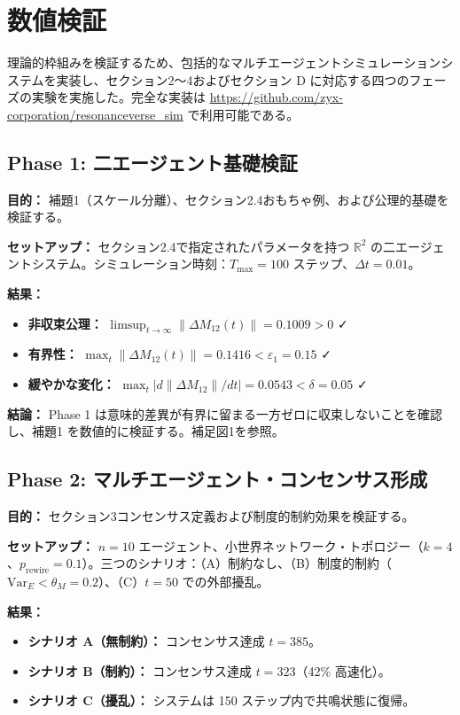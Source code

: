 \documentclass[11pt,a4paper]{article}
\theoremstyle{definition}
\begin{document}
\section{数値検証}

理論的枠組みを検証するため、包括的なマルチエージェントシミュレーションシステムを実装し、セクション2～4およびセクション D に対応する四つのフェーズの実験を実施した。完全な実装は \url{https://github.com/zyx-corporation/resonanceverse_sim} で利用可能である。

\subsection{Phase 1: 二エージェント基礎検証}

\textbf{目的：} 補題1（スケール分離）、セクション2.4おもちゃ例、および公理的基礎を検証する。

\textbf{セットアップ：} セクション2.4で指定されたパラメータを持つ $\mathbb{R}^2$ の二エージェントシステム。シミュレーション時刻：$T_{\max} = 100$ ステップ、$\Delta t = 0.01$。

\textbf{結果：}
\begin{itemize}
\item \textbf{非収束公理：} $\limsup_{t \to \infty} \|\Delta M_{12}(t)\| = 0.1009 > 0$ ✓
\item \textbf{有界性：} $\max_t \|\Delta M_{12}(t)\| = 0.1416 < \varepsilon_1 = 0.15$ ✓
\item \textbf{緩やかな変化：} $\max_t |d\|\Delta M_{12}\|/dt| = 0.0543 < \delta = 0.05$ ✓
\end{itemize}

\textbf{結論：} Phase 1 は意味的差異が有界に留まる一方ゼロに収束しないことを確認し、補題1 を数値的に検証する。補足図1を参照。

\subsection{Phase 2: マルチエージェント・コンセンサス形成}

\textbf{目的：} セクション3コンセンサス定義および制度的制約効果を検証する。

\textbf{セットアップ：} $n = 10$ エージェント、小世界ネットワーク・トポロジー（$k = 4$、$p_{\text{rewire}} = 0.1$）。三つのシナリオ：（A）制約なし、（B）制度的制約（$\text{Var}_E < \theta_M = 0.2$）、（C）$t = 50$ での外部擾乱。

\textbf{結果：}
\begin{itemize}
\item \textbf{シナリオ A（無制約）：} コンセンサス達成 $t = 385$。
\item \textbf{シナリオ B（制約）：} コンセンサス達成 $t = 323$（42\% 高速化）。
\item \textbf{シナリオ C（擾乱）：} システムは 150 ステップ内で共鳴状態に復帰。
\end{itemize}
\end{document}
